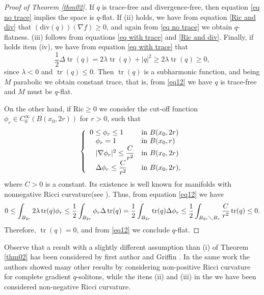 \documentclass{amsart}
\theoremstyle{plain}
\numberwithin{equation}{section}
\begin{document}
\begin{proof}[Proof of Theorem \ref{thm02}]
If $q$ is trace-free and divergence-free, then equation \eqref{eq no trace} implies the space is $q$-flat. If (ii) holds, we have from equation \eqref{Ric and div} that $(\mathrm{div}(q))(\nabla f) \geq0$, and again from \eqref{eq no trace} we obtain $q$-flatness. (iii) follows from equations \eqref{eq with trace} and \eqref{Ric and div}. Finally, if holds item (iv), we have from equation  \eqref{eq with trace} that
\begin{equation}\label{eq12}
    \frac{1}{2}\Delta\operatorname{tr}(q)=2\lambda\operatorname{tr}(q)+|q|^2\geq2\lambda\operatorname{tr}(q)\geq0,
\end{equation}
 since $\lambda<0$ and $\operatorname{tr}(q)\leq0$. Then $\operatorname{tr}(q)$ is a subharmonic function, and being $M$ parabolic we obtain constant trace, that is, from \eqref{eq12} we have $q$ is trace-free and $M$ must be $q$-flat.

On the other hand, if  $\text{Ric}\geq0$ we consider the cut-off function $\phi_r\in C_0^\infty(B(x_0,2r))$ for $r>0$, such that
\begin{eqnarray}\label{prob 0}\left\{ \begin{array}{lllll}
0\leq\phi_r\leq1 & {\rm in}\,\,B(x_0,2r)\\
\,\,\,\,\,\phi_r=1 & {\rm in}\,\, B(x_0,r)\\
\,\,\,\,\,|\nabla\phi_r|^2\leq\dfrac{C}{r^2} & {\rm in}\,\,B(x_0,2r)\\
\,\,\,\,\,\Delta\phi_r\leq\dfrac{C}{r^2} & {\rm in}\,\,B(x_0,2r),\\
\end{array}\right.
\end{eqnarray}
where $C>0$ is a constant. Its existence is well known for manifolds with nonnegative Ricci curvature(see \cite[Theorem 2.2]{Batu}). Thus, from equation \eqref{eq12} we have
$$0\leq\int_{B_{2r}}2\lambda\operatorname{tr}(q)\phi_r\leq\frac{1}{2}\int_{B_{2r}}\phi_r\Delta\operatorname{tr}(q)=\frac{1}{2}\int_{B_{2r}}\operatorname{tr}(q)\Delta\phi_r\leq\frac{1}{2}\int_{{B_{2r}}\diagdown B_r}\frac{C}{r^2}\operatorname{tr}(q)\leq0.$$
Therefore, $\operatorname{tr}(q)=0$, and from \eqref{eq12} we conclude $q$-flat.

\end{proof}

Observe that a result with a slightly different assumption than  (i) of Theorem \ref{thm02} has been considered by first author and Griffin \cite[Theorem 2.6]{Cunha and Griffin}. In the same work the authors showed many other results by considering non-positive Ricci curvature for complete gradient $q$-solitons, while the itens (ii) and (iii) in the we have been considered non-negative Ricci curvature.
\end{document}
